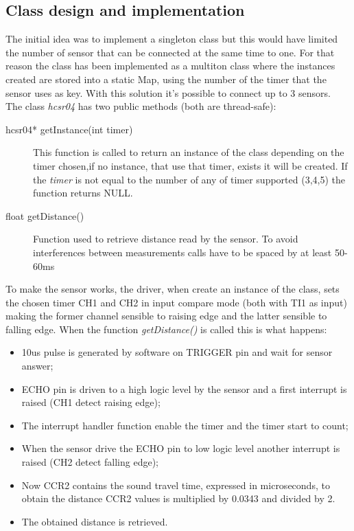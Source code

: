 \subsection{Class design and implementation}
The initial idea was to implement a singleton class but this would have limited the number of sensor that can be connected at the same time to one.
For that reason the class has been implemented as a multiton class where the instances created are stored into a static Map, using the number of the timer that the sensor uses as key. With this solution it's possible to connect up to 3 sensors.\\
The class \textit{hcsr04} has two public methods (both are thread-safe):
\begin{description}
\item [hcsr04* getInstance(int \textunderscore timer)] This function is called to return an instance of the class depending on the timer chosen,if no instance, that use that timer, exists it will be created. If the \textit{ \textunderscore timer} is not equal to the number of any of timer supported (3,4,5) the function returns NULL.
\item [float getDistance()] Function used to retrieve distance read by the sensor. To avoid interferences between measurements calls have to be spaced by at least 50-60ms
\end{description}

To make the sensor works, the driver, when create an instance of the class, sets the chosen timer CH1 and CH2 in input compare mode (both with TI1 as input) making the former channel sensible to raising edge and the latter sensible to falling edge. 
When the function \textit{getDistance()} is called this is what happens:
\begin{itemize}
\item 10us pulse is generated by software on TRIGGER pin and wait for sensor answer;
\item ECHO pin is driven to a high logic level by the sensor and a first interrupt is raised (CH1 detect raising edge);
\item The interrupt handler function enable the timer and the timer start to count;
\item When the sensor drive the ECHO pin to low logic level another interrupt is raised (CH2 detect falling edge);
\item Now CCR2 contains the sound travel time, expressed in microseconds, to obtain the distance CCR2 values is multiplied by 0.0343 and divided by 2.
\item The obtained distance is retrieved.
\end{itemize}

